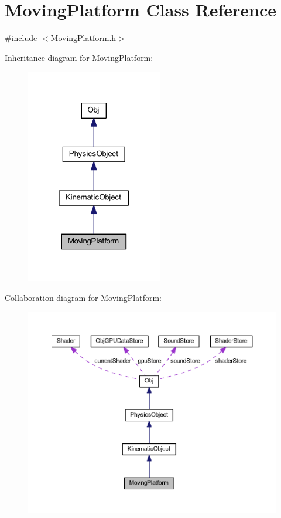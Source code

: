 \hypertarget{class_moving_platform}{}\section{Moving\+Platform Class Reference}
\label{class_moving_platform}


{\ttfamily \#include $<$Moving\+Platform.\+h$>$}



Inheritance diagram for Moving\+Platform\+:
\nopagebreak
\begin{figure}[H]
\begin{center}
\leavevmode
\includegraphics[width=169pt]{class_moving_platform__inherit__graph}
\end{center}
\end{figure}


Collaboration diagram for Moving\+Platform\+:
\nopagebreak
\begin{figure}[H]
\begin{center}
\leavevmode
\includegraphics[width=350pt]{class_moving_platform__coll__graph}
\end{center}
\end{figure}
